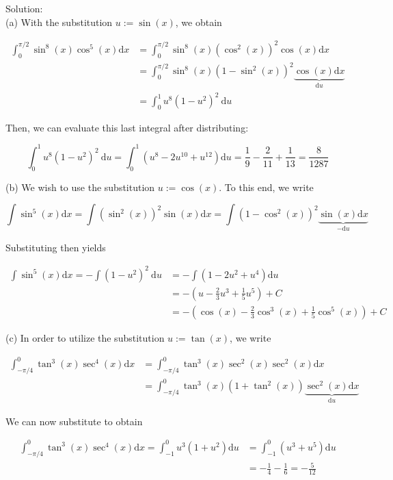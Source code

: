 \documentclass[10pt]{article}
\begin{document}
Solution:\\
(a) With the substitution $u:=\sin (x)$, we obtain

$$
\begin{aligned}
\int_{0}^{\pi / 2} \sin ^{8}(x) \cos ^{5}(x) \mathrm{d} x & =\int_{0}^{\pi / 2} \sin ^{8}(x)\left(\cos ^{2}(x)\right)^{2} \cos (x) \mathrm{d} x \\
& =\int_{0}^{\pi / 2} \sin ^{8}(x)\left(1-\sin ^{2}(x)\right)^{2} \underbrace{\cos (x) \mathrm{d} x}_{\mathrm{d} u} \\
& =\int_{0}^{1} u^{8}\left(1-u^{2}\right)^{2} \mathrm{~d} u
\end{aligned}
$$

Then, we can evaluate this last integral after distributing:

$$
\int_{0}^{1} u^{8}\left(1-u^{2}\right)^{2} \mathrm{~d} u=\int_{0}^{1}\left(u^{8}-2 u^{10}+u^{12}\right) \mathrm{d} u=\frac{1}{9}-\frac{2}{11}+\frac{1}{13}=\frac{8}{1287}
$$

(b) We wish to use the substitution $u:=\cos (x)$. To this end, we write

$$
\int \sin ^{5}(x) \mathrm{d} x=\int\left(\sin ^{2}(x)\right)^{2} \sin (x) \mathrm{d} x=\int\left(1-\cos ^{2}(x)\right)^{2} \underbrace{\sin (x) \mathrm{d} x}_{-\mathrm{d} u}
$$

Substituting then yields

$$
\begin{aligned}
\int \sin ^{5}(x) \mathrm{d} x=-\int\left(1-u^{2}\right)^{2} \mathrm{~d} u & =-\int\left(1-2 u^{2}+u^{4}\right) \mathrm{d} u \\
& =-\left(u-\frac{2}{3} u^{3}+\frac{1}{5} u^{5}\right)+C \\
& =-\left(\cos (x)-\frac{2}{3} \cos ^{3}(x)+\frac{1}{5} \cos ^{5}(x)\right)+C
\end{aligned}
$$

(c) In order to utilize the substitution $u:=\tan (x)$, we write

$$
\begin{aligned}
\int_{-\pi / 4}^{0} \tan ^{3}(x) \sec ^{4}(x) \mathrm{d} x & =\int_{-\pi / 4}^{0} \tan ^{3}(x) \sec ^{2}(x) \sec ^{2}(x) \mathrm{d} x \\
& =\int_{-\pi / 4}^{0} \tan ^{3}(x)\left(1+\tan ^{2}(x)\right) \underbrace{\sec ^{2}(x) \mathrm{d} x}_{\mathrm{d} u}
\end{aligned}
$$

We can now substitute to obtain

$$
\begin{aligned}
\int_{-\pi / 4}^{0} \tan ^{3}(x) \sec ^{4}(x) \mathrm{d} x=\int_{-1}^{0} u^{3}\left(1+u^{2}\right) \mathrm{d} u & =\int_{-1}^{0}\left(u^{3}+u^{5}\right) \mathrm{d} u \\
& =-\frac{1}{4}-\frac{1}{6}=-\frac{5}{12}
\end{aligned}
$$
\end{document}
